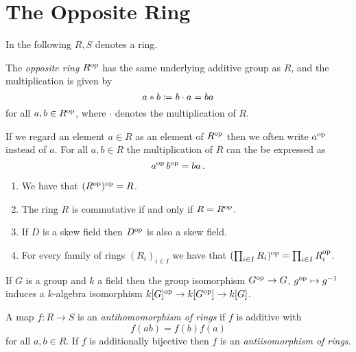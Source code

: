 \section{The Opposite Ring}
\label{appendix: the opposite ring}


\begin{conventions}
  In the following $R, S$ denotes a ring.
\end{conventions}


\begin{definition}
  The \emph{opposite ring} $R^{\operatorname{op}}$ has the same underlying additive group as $R$, and the multiplication is given by
  \[
              a * b
    \coloneqq  b \cdot a
    =         ba
  \]
  for all $a, b \in R^{\operatorname{op}}$, where $\cdot$ denotes the multiplication of $R$.
\end{definition}


\begin{notation}
  If we regard an element $a \in R$ as an element of $R^{\operatorname{op}}$ then we often write $a^{{\operatorname{op}}}$ instead of $a$.
  For all $a, b \in R$ the multiplication of $R$ can the be expressed as
  \[
      a^{\operatorname{op}} \, b^{\operatorname{op}}
    = b a \,.
  \]
\end{notation}


\begin{lemma}
  \label{remark: basic properties of op}
  \leavevmode
  \begin{enumerate}
    \item
      We have that $( R^{\operatorname{op}} )^{\operatorname{op}} = R$.
    \item
      The ring $R$ is commutative if and only if $R = R^{\operatorname{op}}$.
    \item
      If $D$ is a skew field then $D^{\operatorname{op}}$ is also a skew field.
    \item
      For every family of rings $(R_i)_{i \in I}$ we have that $( \prod_{i \in I} R_i )^{\operatorname{op}} = \prod_{i \in I} R_i^{\operatorname{op}}$.
  \end{enumerate}
\end{lemma}


\begin{example}
  If $G$ is a group and $k$ a field then the group isomorphism $G^{\operatorname{op}} \to G$, $g^{\operatorname{op}} \mapsto g^{-1}$ induces a $k$-algebra isomorphism $k[G]^{\operatorname{op}} \to k[G^{\operatorname{op}}] \to k[G]$.
\end{example}


\begin{definition}
  A map $f \colon R \to S$ is an \emph{antihomomorphism of rings} if $f$ is additive with
  \[
    f(a b) = f(b) f(a)
  \]
  for all $a, b \in R$.
  If $f$ is additionally bijective then $f$ is an \emph{antiisomorphism of rings}.
\end{definition}


